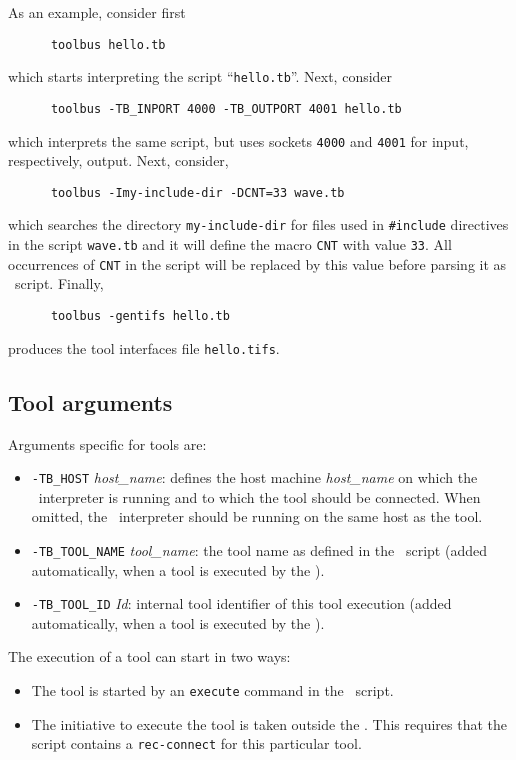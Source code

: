\noindent As an example, consider first
\begin{verbatim}
      toolbus hello.tb
\end{verbatim}
which starts interpreting the script ``{\tt hello.tb}''. Next, consider
\begin{verbatim}
      toolbus -TB_INPORT 4000 -TB_OUTPORT 4001 hello.tb
\end{verbatim}
which interprets the same script, but uses sockets {\tt 4000} and {\tt 4001} for
input, respectively, output. Next, consider,
\begin{verbatim}
      toolbus -Imy-include-dir -DCNT=33 wave.tb
\end{verbatim}
which searches the directory {\tt my-include-dir} for files used in {\tt \#include}
directives in the script {\tt wave.tb} and it will define the macro
{\tt CNT} with value {\tt 33}. All occurrences of {\tt CNT} in the script
will be replaced by this value before parsing it as \T\ script.
Finally,
\begin{verbatim}
      toolbus -gentifs hello.tb
\end{verbatim}
produces the tool interfaces file {\tt hello.tifs}.

\subsection{\label{ToolArgs}Tool arguments}
Arguments specific for tools are:
\begin{itemize}
\item {\tt -TB\_HOST} {\em host\_name}: defines the host machine {\em host\_name}
on which the \TB\ interpreter is running and to which the tool should be connected.
When omitted, the \TB\ interpreter should be running on the same
host as the tool.
\item {\tt -TB\_TOOL\_NAME} {\em tool\_name}: the tool name as
defined in the \T\ script (added automatically, when a tool is executed
by the \TB).
\item {\tt -TB\_TOOL\_ID} {\em Id}: internal tool identifier of this tool execution
(added automatically, when a tool is executed by the \TB).
\end{itemize}

\noindent The execution of a tool can start in two ways:
\begin{itemize}
\item The tool is started by an {\tt execute} command in the \T\ script.

\item The initiative to execute the tool is taken
outside the \TB. This requires that the script contains a {\tt rec-connect}
for this particular tool.
\end{itemize}

